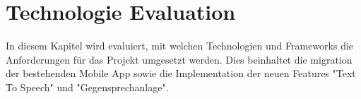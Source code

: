 \section{Technologie Evaluation}

In diesem Kapitel wird evaluiert, mit welchen Technologien und Frameworks die Anforderungen für das Projekt umgesetzt werden.
Dies beinhaltet die migration der bestehenden Mobile App\cite{ip5}
sowie die Implementation der neuen Features "Text To Speech" und "Gegensprechanlage".






